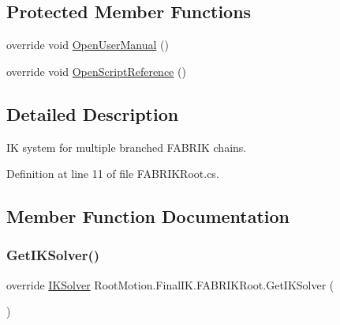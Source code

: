 \subsection*{Protected Member Functions}
\begin{DoxyCompactItemize}
\item 
override void \mbox{\hyperlink{class_root_motion_1_1_final_i_k_1_1_f_a_b_r_i_k_root_a1603e05ce4253accd82d0aee081cc115}{Open\+User\+Manual}} ()
\item 
override void \mbox{\hyperlink{class_root_motion_1_1_final_i_k_1_1_f_a_b_r_i_k_root_a7d313fec290479a2b5bcec328d63fd09}{Open\+Script\+Reference}} ()
\end{DoxyCompactItemize}


\subsection{Detailed Description}
IK system for multiple branched F\+A\+B\+R\+IK chains. 



Definition at line 11 of file F\+A\+B\+R\+I\+K\+Root.\+cs.



\subsection{Member Function Documentation}
\mbox{\label{class_root_motion_1_1_final_i_k_1_1_f_a_b_r_i_k_root_a3bc8f9e7db9f8eafb22c95530f2a9f7c}} 
\subsubsection{\texorpdfstring{Get\+I\+K\+Solver()}{GetIKSolver()}}
{\footnotesize\ttfamily override \mbox{\hyperlink{class_root_motion_1_1_final_i_k_1_1_i_k_solver}{I\+K\+Solver}} Root\+Motion.\+Final\+I\+K.\+F\+A\+B\+R\+I\+K\+Root.\+Get\+I\+K\+Solver (\begin{DoxyParamCaption}{ }\end{DoxyParamCaption})\hspace{0.3cm}{\ttfamily [virtual]}}



